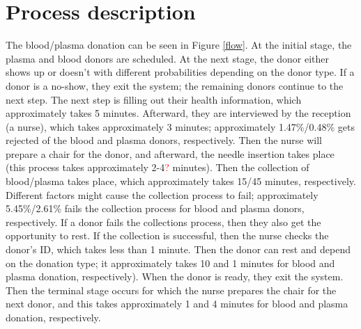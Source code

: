 \documentclass[a4paper,12pt]{article}
\begin{document}
\section{Process description}
The blood/plasma donation can be seen in Figure \ref{flow}. At the initial stage, the plasma and blood donors are scheduled. At the next stage, the donor either shows up or doesn't with different probabilities depending on the donor type. If a donor is a no-show, they exit the system; the remaining donors continue to the next step. The next step is filling out their health information, which approximately takes 5 minutes. Afterward, they are interviewed by the reception (a nurse), which takes approximately 3 minutes; approximately 1.47\%/0.48\% gets rejected of the blood and plasma donors, respectively. Then the nurse will prepare a chair for the donor, and afterward, the needle insertion takes place (this process takes approximately 2-4\textcolor{red}{?} minutes). Then the collection of blood/plasma takes place, which approximately takes 15/45 minutes, respectively. Different factors might cause the collection process to fail; approximately 5.45\%/2.61\% fails the collection process for blood and plasma donors, respectively. If a donor fails the collections process, then they also get the opportunity to rest. If the collection is successful, then the nurse checks the donor's ID, which takes less than 1 minute. Then the donor can rest and depend on the donation type; it approximately takes 10 and 1 minutes for blood and plasma donation, respectively). When the donor is ready, they exit the system. Then the terminal stage occurs for which the nurse prepares the chair for the next donor, and this takes approximately 1 and 4 minutes for blood and plasma donation, respectively.


\end{document}
